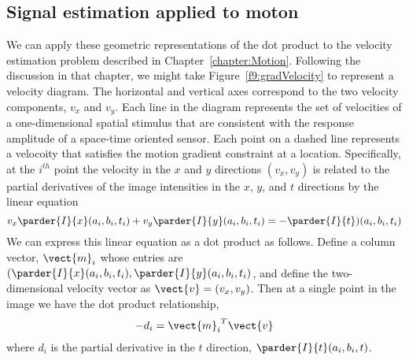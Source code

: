 \subsection*{Signal estimation applied to moton}
We can apply these geometric representations of the dot product to the
velocity estimation problem described in Chapter~\ref{chapter:Motion}.
Following the discussion in that chapter, we might take
Figure~\ref{f9:gradVelocity} to represent a velocity 
diagram.  The horizontal and vertical axes correspond to the two
velocity components, $v_x$ and $v_y$.  Each line in the diagram
represents the set of velocities of a 
one-dimensional spatial stimulus that are consistent with the response
amplitude of a space-time oriented sensor.  Each point on a dashed line
represents a velocoity that satisfies the motion gradient constraint
at a location. 
Specifically, at the $i^{th}$ point the velocity in the $x$ and $y$
directions $(v_x,v_y)$ is related to the partial derivatives of the
image intensities in the $x$, $y$, and $t$ directions by the linear
equation
\begin{equation}
v_{x} \parder{I}{x}(a_i,b_i,t_i) + 
  v_{y} \parder{I}{y}(a_i,b_i,t_i) = - \parder{I}{t})(a_i,b_i,t_i)
\end{equation}
We can express this linear equation as a dot product as follows.
Define a column vector, $\vect{m}_i$ whose entries are
$(\parder{I}{x}(a_i,b_i,t_i), \parder{I}{y}(a_i,b_i,t_i)$, and define
the two-dimensional velocity vector as $\vect{v} = (v_x , v_y)$.
Then at a single point in the image we have the dot product relationship,
\[
- d_i = {\vect{m}_i}^T \vect{v}
\]
where $d_i$ is the partial derivative in the $t$ direction,
$\parder{I}{t}(a_i,b_i,t)$. 

